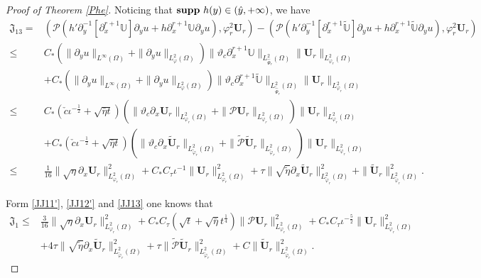 \documentclass{amsart}
\numberwithin{equation}{section}
\begin{document}
\begin{proof}[Proof of Theorem \ref{Phe}]
Noticing that ${\bf supp}~h(y)\in(\hat{y},+\infty)$, we have
\begin{align}\label{JJ13}
\mathfrak{J}_{13}
=&(\mathcal{P}(h'\partial_{y}^{-1}[\partial_{x}^{r+1}\mathbb{U}]\partial_{y}u+h\partial_{x}^{r+1}\mathbb{U}\partial_{y}u),\varphi_{r}^{2}\mathbf{U}_{r})
 -(\mathcal{P}(h'\partial_{y}^{-1}[\partial_{x}^{r+1}\tilde{\mathbb{U}}]\partial_{y}u+h\partial_{x}^{r+1}\tilde{\mathbb{U}}\partial_{y}u),\varphi_{r}^{2}\mathbf{U}_{r})\\
\leq& C_{*}\left(\|\partial_{y}u\|_{L^{\infty}(\Omega)}+\|\partial_{y}u\|_{L_{\varphi}^{2}(\Omega)}\right)
           \|\vartheta_{c}\partial_{x}^{r+1}\mathbb{U}\|_{L_{\hat{\Psi}_{r}}^{2}(\Omega)}\|\mathbf{U}_{r}\|_{L_{\varphi_{r}}^{2}(\Omega)}\nonumber\\
    &+C_{*}\left(\|\partial_{y}u\|_{L^{\infty}(\Omega)}+\|\partial_{y}u\|_{L_{\varphi}^{2}(\Omega)}\right)
           \|\vartheta_{c}\partial_{x}^{r+1}\tilde{\mathbb{U}}\|_{L_{\tilde{\hat{\Psi}}_{r}}^{2}(\Omega)}\|\mathbf{U}_{r}\|_{L_{\varphi_{r}}^{2}(\Omega)}\nonumber\\
\leq& C_{*}(\check{c}\iota^{-\frac{1}{2}}+\sqrt{\bar{\eta}t})
           \left(\|\vartheta_{c}\partial_{x}\mathbf{U}_{r}\|_{L_{\varphi_{r}}^{2}(\Omega)}+\|\mathcal{P}\mathbf{U}_{r}\|_{L_{\varphi_{r}}^{2}(\Omega)}\right)
           \|\mathbf{U}_{r}\|_{L_{\varphi_{r}}^{2}(\Omega)}\nonumber\\
    &+C_{*}(\check{c}\iota^{-\frac{1}{2}}+\sqrt{\bar{\eta}t})
           \left(\|\vartheta_{c}\partial_{x}\tilde{\mathbf{U}}_{r}\|_{L_{\tilde{\varphi}_{r}}^{2}(\Omega)}+\|\tilde{\mathcal{P}}\tilde{\mathbf{U}}_{r}\|_{L_{\tilde{\varphi}_{r}}^{2}(\Omega)}\right)
           \|\mathbf{U}_{r}\|_{L_{\varphi_{r}}^{2}(\Omega)}\nonumber\\
\leq& \frac{1}{16}\|\sqrt{\eta}\partial_{x}\mathbf{U}_{r}\|_{L_{\varphi_{r}}^{2}(\Omega)}^{2}
     +C_{*}C_{\tau}\iota^{-1}\|\mathbf{U}_{r}\|_{L_{\varphi_{r}}^{2}(\Omega)}^{2}
     +\tau\|\sqrt{\tilde{\eta}}\partial_{x}\tilde{\mathbf{U}}_{r}\|_{L_{\tilde{\varphi}_{r}}^{2}(\Omega)}^{2}
     +\|\tilde{\mathbf{U}}_{r}\|_{L_{\tilde{\varphi}_{r}}^{2}(\Omega)}^{2}.\nonumber
\end{align}

Form \eqref{JJ11'}, \eqref{JJ12'} and \eqref{JJ13} one knows that
\begin{align}\label{JJ1}
\mathfrak{J}_{1}
\leq& \frac{3}{16}\|\sqrt{\eta}\partial_{x}\mathbf{U}_{r}\|_{L_{\varphi_{r}}^{2}(\Omega)}^{2}
     +C_{*}C_{\tau}(\sqrt{t}+\sqrt{\bar{\eta}}t^{\frac{1}{4}})\|\mathcal{P}\mathbf{U}_{r}\|_{L_{\varphi_{r}}^{2}(\Omega)}^{2}
     +C_{*}C_{\tau}\iota^{-\frac{5}{2}}\|\mathbf{U}_{r}\|_{L_{\varphi_{r}}^{2}(\Omega)}^{2}\\
    &+4\tau\|\sqrt{\tilde{\eta}}\partial_{x}\tilde{\mathbf{U}}_{r}\|_{L_{\tilde{\varphi}_{r}}^{2}(\Omega)}^{2}
     +\tau\|\tilde{\mathcal{P}}\tilde{\mathbf{U}}_{r}\|_{L_{\tilde{\varphi}_{r}}^{2}(\Omega)}^{2}
     +C\|\tilde{\mathbf{U}}_{r}\|_{L_{\tilde{\varphi}_{r}}^{2}(\Omega)}^{2}.\nonumber
\end{align}


\end{proof}
\end{document}
